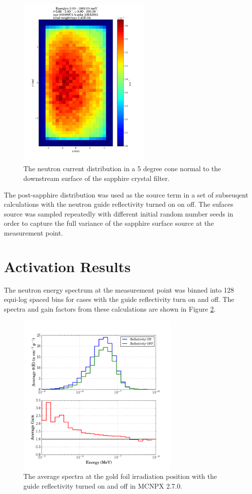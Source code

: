 \documentclass[a4paper,
              ]{jacow}
\begin{document}
\begin{figure}[!htb]
   \centering
   \includegraphics*[trim = 0mm 20mm 0mm 7mm, width=65mm]{graphics/sappdist.pdf}
   \caption{The neutron current distribution in a 5 degree cone normal to the downstream surface of the sapphire crystal filter.}
   \label{sappdist}
\end{figure}

The post-sapphire distribution was used as the source term in a set of subseuqent calculations with the neutron guide reflectivity turned on on off.  The sufaces source was sampled repeatedly with different initial random number seeds in order to capture the full variance of the sapphire surface source at the measurement point.

\section{Activation Results}

The neutron energy spectrum at the measurement point was binned into 128 equi-log spaced bins for cases with the guide reflectivity turn on and off.  The spectra and gain factors from these calculations are shown in Figure \ref{gain}.  

\begin{figure}[!htb]
   \centering
   \includegraphics*[trim = 10mm 5mm 15mm 17mm, width=80mm]{graphics/gain.pdf}
   \caption{The average spectra at the gold foil irradiation position with the guide reflectivity turned on and off in MCNPX 2.7.0.}
   \label{gain}
\end{figure}
\end{document}
